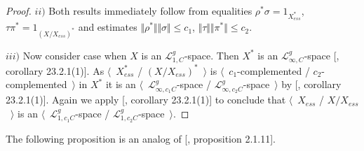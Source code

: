 \begin{proof}
$ii)$ Both results immediately follow from equalities $\rho^*\sigma=1_{X_{ess}^*}$, $\tau \pi^*=1_{(X/X_{ess})^*}$ and estimates $\Vert \rho^*\Vert\Vert \sigma\Vert\leq c_1$, $\Vert\tau\Vert\Vert \pi^*\Vert\leq c_2$.

$iii)$ Now consider case when $X$ is an $\mathscr{L}_{1,C}^g$-space. Then $X^*$ is an $\mathscr{L}_{\infty,C}^g$-space [\cite{DefFloTensNorOpId}, corollary 23.2.1(1)]. As $\langle$~$X_{ess}^*$ / $(X/X_{ess})^*$~$\rangle$ is $\langle$~$c_1$-complemented / $c_2$-complemented~$\rangle$ in $X^*$ it is an $\langle$~$\mathscr{L}_{\infty,c_1C}^g$-space / $\mathscr{L}_{\infty,c_2C}^g$-space~$\rangle$ by [\cite{DefFloTensNorOpId}, corollary 23.2.1(1)]. Again we apply [\cite{DefFloTensNorOpId}, corollary 23.2.1(1)] to conclude that $\langle$~$X_{ess}$  / $X/X_{ess}$~$\rangle$ is an $\langle$~$\mathscr{L}_{1,c_1C}^g$-space / $\mathscr{L}_{1,c_2C}^g$-space~$\rangle$.
\end{proof}

The following proposition is an analog of [\cite{RamsHomPropSemgroupAlg}, proposition 2.1.11].

